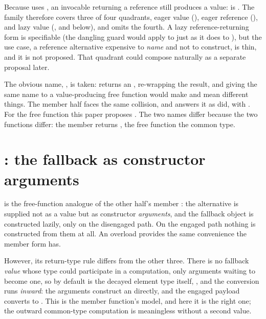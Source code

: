 \documentclass[a4paper,10pt,oneside,openany,final,article]{memoir}
\begin{document}
Because  uses , an invocable returning
a reference still produces a value:  is
. The family therefore covers three of four quadrants, eager
value (), eager reference (), and lazy
value (, and  below), and omits the
fourth. A lazy reference-returning form is specifiable (the dangling guard
would apply to  just as it does to ), but
the use case, a reference alternative expensive to \emph{name} and not to
construct, is thin, and it is not proposed. That quadrant could compose
naturally as a separate  proposal later.

The obvious name, , is taken:
 returns an , re-wrapping the
result, and giving the same name to a value-producing free function would
make  and  mean different things.
The member half faces the same collision, and answers it as \cite{P3413R0}
did, with . For the free function this paper proposes
. The two names differ because the two functions differ:
the member returns , the free function the common type.

\section{: the fallback as constructor arguments}

 is the free-function analogue of the other half's member
: the alternative is supplied not as a
value but as constructor \emph{arguments}, and the fallback object is
constructed lazily, only on the disengaged path. On the engaged path nothing
is constructed from them at all. An  overload
provides the same convenience the member form has.

However, its return-type rule differs from the other three. There is no
fallback \emph{value} whose type could participate in a
 computation, only arguments waiting to become one,
so by default  is the decayed element type itself,
, and the conversion runs
\emph{inward}: the arguments construct an  directly, and the
engaged payload converts to . This is the member function's model,
and here it is the right one; the outward common-type computation is
meaningless without a second value.
\end{document}
